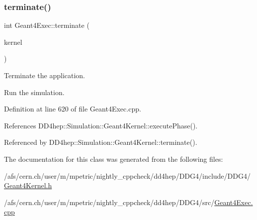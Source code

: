 \hypertarget{class_d_d4hep_1_1_simulation_1_1_geant4_exec_a592e79f8ae539bd7491cd3af0572555c}{}\label{class_d_d4hep_1_1_simulation_1_1_geant4_exec_a592e79f8ae539bd7491cd3af0572555c} 
\subsubsection{\texorpdfstring{terminate()}{terminate()}}
{\footnotesize\ttfamily int Geant4\+Exec\+::terminate (\begin{DoxyParamCaption}\item[{\hyperlink{class_d_d4hep_1_1_simulation_1_1_geant4_kernel}{Geant4\+Kernel} \&}]{kernel }\end{DoxyParamCaption})\hspace{0.3cm}{\ttfamily [static]}}



Terminate the application. 

Run the simulation. 

Definition at line 620 of file Geant4\+Exec.\+cpp.



References D\+D4hep\+::\+Simulation\+::\+Geant4\+Kernel\+::execute\+Phase().



Referenced by D\+D4hep\+::\+Simulation\+::\+Geant4\+Kernel\+::terminate().



The documentation for this class was generated from the following files\+:\begin{DoxyCompactItemize}
\item 
/afs/cern.\+ch/user/m/mpetric/nightly\+\_\+cppcheck/dd4hep/\+D\+D\+G4/include/\+D\+D\+G4/\hyperlink{_geant4_kernel_8h}{Geant4\+Kernel.\+h}\item 
/afs/cern.\+ch/user/m/mpetric/nightly\+\_\+cppcheck/dd4hep/\+D\+D\+G4/src/\hyperlink{_geant4_exec_8cpp}{Geant4\+Exec.\+cpp}\end{DoxyCompactItemize}
